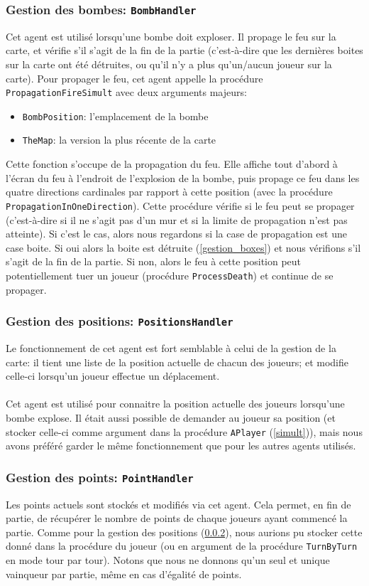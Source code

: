 \documentclass{article}
\begin{document}
\subsubsection{Gestion des bombes: \texttt{BombHandler}}
\label{gestion_bombes}
Cet agent est utilisé lorsqu'une bombe doit exploser. Il propage le feu sur la carte, et vérifie s'il s'agit de la fin de la partie (c'est-à-dire que les dernières boites sur la carte ont été détruites, ou qu'il n'y a plus qu'un/aucun joueur sur la carte). Pour propager le feu, cet agent appelle la procédure \texttt{PropagationFireSimult} avec deux arguments majeurs: 
\begin{itemize}
	\item \texttt{BombPosition}: l'emplacement de la bombe
	\item \texttt{TheMap}: la version la plus récente de la carte
\end{itemize}
Cette fonction s'occupe de la propagation du feu. Elle affiche tout d'abord à l'écran du feu à l'endroit de l'explosion de la bombe, puis propage ce feu dans les quatre directions cardinales par rapport à cette position (avec la procédure \texttt{PropagationInOneDirection}). Cette procédure vérifie si le feu peut se propager (c'est-à-dire si il ne s'agit pas d'un mur et si la limite de propagation n'est pas atteinte). Si c'est le cas, alors nous regardons si la case de propagation est une case boite. Si oui alors la boite est détruite (\ref{gestion_boxes}) et nous vérifions s'il s'agit de la fin de la partie. Si non, alors le feu à cette position peut potentiellement tuer un joueur (procédure \texttt{ProcessDeath}) et continue de se propager.
\subsubsection{Gestion des positions: \texttt{PositionsHandler}}
\label{gestion_positions}
Le fonctionnement de cet agent est fort semblable à celui de la gestion de la carte: il tient une liste de la position actuelle de chacun des joueurs; et modifie celle-ci lorsqu'un joueur effectue un déplacement. \\ \\
Cet agent est utilisé pour connaitre la position actuelle des joueurs lorsqu'une bombe explose. Il était aussi possible de demander au joueur sa position (et stocker celle-ci comme argument dans la procédure \texttt{APlayer} (\ref{simult})), mais nous avons préféré garder le même fonctionnement que pour les autres agents utilisés.
\subsubsection{Gestion des points: \texttt{PointHandler}}
\label{gestion_points}
Les points actuels sont stockés et modifiés via cet agent. Cela permet, en fin de partie, de récupérer le nombre de points de chaque joueurs ayant commencé la partie. Comme pour la gestion des positions (\ref{gestion_positions}), nous aurions pu stocker cette donné dans la procédure du joueur (ou en argument de la procédure \texttt{TurnByTurn} en mode tour par tour). Notons que nous ne donnons qu'un seul et unique vainqueur par partie, même en cas d'égalité de points.
\end{document}
